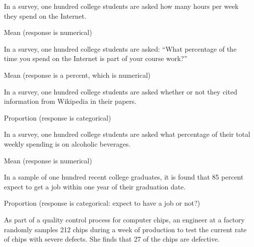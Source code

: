 \documentclass[12pt]{exam}
\begin{document}
\begin{questions}
  \begin{parts}
  \item
    In a survey, one hundred college students are asked how many hours
    per week they spend on the Internet.
\begin{solution}
Mean (response is numerical)
\end{solution}
\vfill
  \item
    In a survey, one hundred college students are asked: ``What
    percentage of the time you spend on the Internet is part of your
    course work?''
\begin{solution}
Mean (response is a percent, which is numerical)
\end{solution}
\vfill
  \item
    In a survey, one hundred college students are asked whether or not
    they cited information from Wikipedia in their papers.
\begin{solution}
Proportion (response is categorical)
\end{solution}
\vfill
  \item
    In a survey, one hundred college students are asked what percentage
    of their total weekly spending is on alcoholic beverages.
\begin{solution}
Mean (response is numerical)
\end{solution}
\vfill
  \item
    In a sample of one hundred recent college graduates, it is found
    that 85 percent expect to get a job within one year of their
    graduation date.
\begin{solution}
Proportion (response is categorical: expect to have a job or not?)
\end{solution}
\vfill
  \end{parts}
\newpage
\item
  As part of a quality control process for computer chips, an engineer
  at a factory randomly samples 212 chips during a week of production to
  test the current rate of chips with severe defects. She finds that 27
  of the chips are defective.


\end{questions}
\end{document}
